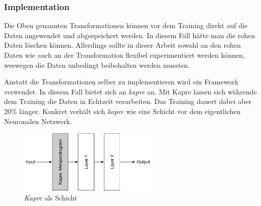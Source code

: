\subsubsection{Implementation}

Die Oben genannten Transformationen können vor dem Training direkt auf die Daten angewendet und abgespeichert werden. In diesem Fall hätte man die rohen Daten löschen können. Allerdings sollte in dieser Arbeit sowohl an den rohen Daten wie auch an der Transformation flexibel experimentiert werden können, weswegen die Daten unbedingt beibehalten werden mussten. 

Anstatt die Transformationen selber zu implementieren wird ein Framework verwendet. In diesem Fall bietet sich an \textit{kapre}\parencite{kapre} an. Mit Kapre lassen sich währende dem Training die Daten in Echtzeit verarbeiten. Das Training dauert dabei aber 20\% länger. Konkret verhält sich \textit{kapre} wie eine Schicht vor dem eigentlichen Neuronalen Netzwerk.
\begin{figure}[hbt]
	\centering
		\includegraphics[width=0.6\textwidth]{assets/kapre.png}
	\centering
	\caption{\textit{Kapre}\parencite{kapre} als Schicht}
	\label{img:kapre}
\end{figure}

